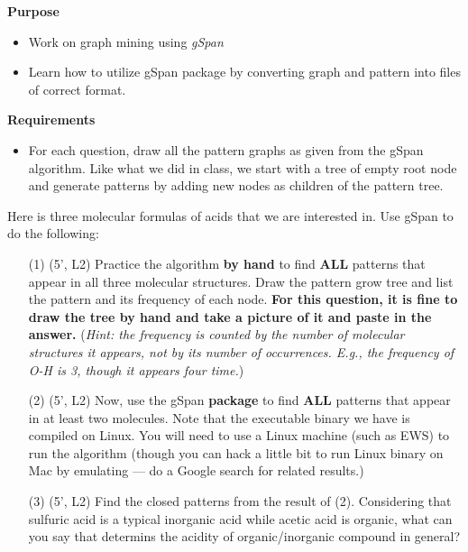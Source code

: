 \documentclass[12pt,letterpaper]{article}
\begin{document}
				\textbf{Purpose} 
				\begin{itemize}\vspace{-2mm}\setlength\itemsep{-1mm}
					\item Work on graph mining using \textit{gSpan}
					\item Learn how to utilize gSpan package by converting graph and pattern into files of correct format.
				\end{itemize}
				
				\textbf{Requirements}
				\begin{itemize}\vspace{-2mm}\setlength\itemsep{-1mm}
					\item For each question, draw all the pattern graphs as given from the gSpan algorithm. Like what we did in class, we start with a tree of empty root node and generate patterns by adding new nodes as children of the pattern tree.
				\end{itemize}
				
				Here is three molecular formulas of acids that we are interested in. Use gSpan to do the following:
				\begin{itemize}
					\item[(1)] (5', L2) Practice the algorithm \textbf{by hand} to find \textbf{ALL} patterns that appear in all three molecular structures. Draw the pattern grow tree and list the pattern and its frequency of each node. \textbf{For this question, it is fine to draw the tree by hand and take a picture of it and paste in the answer.} (\textit{Hint: the frequency is counted by the number of molecular structures it appears, not by its number of occurrences. E.g., the frequency of O-H is 3, though it appears four time.})
					\item[(2)] (5', L2) Now, use the gSpan \textbf{package} to find \textbf{ALL} patterns that appear in at least two molecules. Note that the executable binary we have is compiled on Linux. You will need to use a Linux machine (such as EWS) to run the algorithm (though you can hack a little bit to run Linux binary on Mac by emulating --- do a Google search for related results.)
					\item[(3)] (5', L2) Find the closed patterns from the result of (2). Considering that sulfuric acid is a typical inorganic acid while acetic acid is organic, what can you say that determins the acidity of organic/inorganic compound in general?
				\end{itemize}
				
				
			
\end{document}
